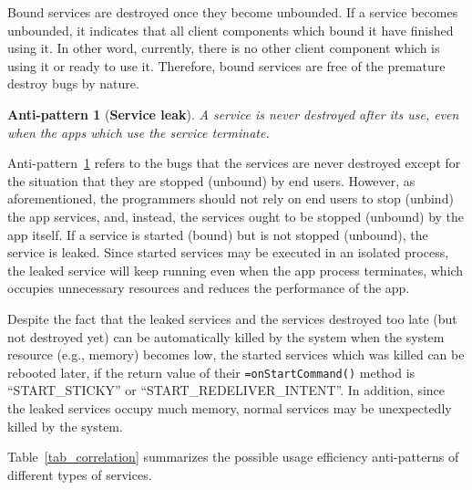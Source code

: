 \documentclass[sigconf,review, anonymous]{acmart}
\newcommand{\hytt}[1]{\texttt{\hyphenchar\font=\defaulthyphenchar #1}}
\newtheorem{pattern}{Anti-pattern}
\begin{document}
Bound services are destroyed once they become unbounded. 
If a service becomes unbounded, it indicates that all client components which bound it have finished using it. 
In other word, currently, there is no other client component which is using it or ready to use it. Therefore, bound services are free of the premature destroy bugs by nature.

%  
  
\begin{pattern} [\textbf{Service leak}] A service is never destroyed after its use, even when the apps which use the service terminate.
\label{p_serviceleak}
\end{pattern}


 

Anti-pattern~\ref{p_serviceleak} refers to the bugs that the services are never destroyed except for the situation that they are stopped (unbound) by end users. However, as aforementioned, the programmers should not rely on end users to stop (unbind) the app services, and, instead, the services ought to be stopped (unbound) by the app itself. If a service is started (bound) but is not stopped (unbound), the service is leaked. Since started services may be executed in an isolated process, the leaked service will keep running even when the app process terminates, which occupies unnecessary resources and reduces the performance of the app. %

Despite the fact that the leaked services and the services destroyed too late (but not destroyed yet) can be automatically killed by the system when the system resource (e.g., memory) becomes low, the started services which was killed can be rebooted later, if the return value of their \hytt{onStartCommand()} method is ``START\_STICKY'' or ``START\_REDELIVER\_INTENT''. In addition, since the leaked services occupy much memory, normal services may be unexpectedly killed by the system.

Table~\ref{tab_correlation} summarizes the possible usage efficiency anti-patterns of different types of services.
\end{document}
